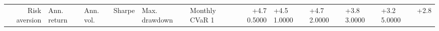 \begin{tabular}{rllrllrl}
\toprule
Risk aversion & Ann. return & Ann. vol. & Sharpe & Max. drawdown & Monthly CVaR 1%
 & +4.7%
0.5000 & +4.5%
1.0000 & +4.7%
2.0000 & +3.8%
3.0000 & +3.2%
5.0000 & +2.8%
\bottomrule
\end{tabular}
